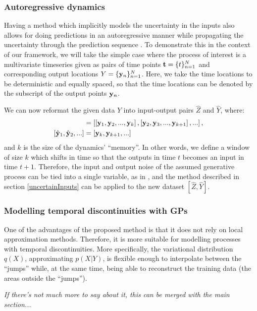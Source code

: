 \subsubsection{Autoregressive dynamics\label{autoregressive}}

Having a method which implicitly models the
uncertainty in the inputs also allows for doing predictions in an autoregressive manner while
propagating the uncertainty through the prediction sequence \cite{Girard:uncertain01}.
To demonstrate this in the context of our framework, we will take the simple case where the
process of interest is a multivariate timeseries given as pairs of time points $\mathbf{t} = \{t\}_{n=1}^N$ and
corresponding output locations $Y = \{\mathbf{y}_n\}_{n=1}^N$. Here, we take the time locations to be
deterministic and equally spaced, so that the time locations can be denoted by the subscript of 
the output points $\mathbf{y}_n$. 

We can now reformat the given data $Y$ into input-output pairs $\hat{Z}$ and $\hat{Y}$,
where:
\begin{align*}
[\hat{\bfzi}_1, \hat{\bfzi}_2, ...] &= \left[ \left[\bfy_1, \bfy_2, ..., \bfy_k \right], \left[\bfy_2, \bfy_3, ..., \bfy_{k+1}\right], ...\right], \\
[\hat{\bfy}_1, \hat{\bfy}_2, ...] &= [\bfy_k, \bfy_{k+1}, ...]
\end{align*}
and $k$ is the size of the dynamics' ``memory''.
In other words, we define a window of size $k$ which shifts in time so that the outputs in time $t$ becomes an input
in time $t+1$. Therefore, the input and output noise of the assumed generative process can be tied into a single variable,
as in \cite{mchutchon:gaussian}, and the method described in section \ref{uncertainInputs}
can be applied to the new dataset $[\hat{Z}, \hat{Y}]$.



\subsubsection{Modelling temporal discontinuities with GPs}

One of the advantages of the proposed method is that it does not rely
on local approximation methods. Therefore, it is more suitable for modelling
processes with temporal discontinuities. More specifically, the variational
distribution $q(X)$, approximating $p(X|Y)$, is flexible enough to
interpolate between the ``jumps'' while, at the same time, being able to reconstruct the
training data (\ie the areas outside the ``jumps'').


 \textit{If there's not much more to say about it, this can be merged with the main section...}
